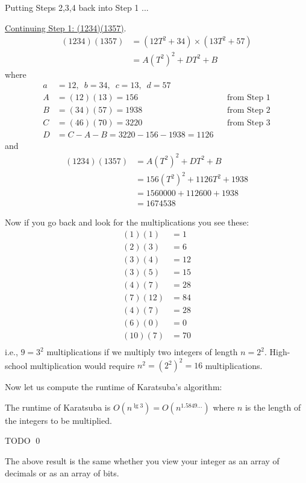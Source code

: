 Putting Steps 2,3,4 back into Step 1 ...

\underline{Continuing Step 1: (1234)(1357)}.
\begin{align*}
(1234)(1357)
&= (12T^2 + 34) \times (13T^2 + 57) \\
&= A (T^2)^2 + D T^2 + B
\end{align*}
where
\begin{align*}
a &= 12, \,\,\, b = 34, \,\,\, c = 13, \,\,\, d = 57 \\
A &= (12)(13) = 156    & & \text{from Step 1}\\
B &= (34)(57) = 1938   & & \text{from Step 2} \\
C &= (46)(70) = 3220   & & \text{from Step 3} \\
D &= C - A - B = 3220 - 156 - 1938 = 1126
\end{align*}
and
\begin{align*}
(1234)(1357)  
&= A(T^2)^2 + D T^2 + B \\
&= 156(T^2)^2 + 1126 T^2 + 1938 \\
&= 1560000 + 112600 + 1938 \\
&= 1674538
\end{align*}

Now if you go back and look for the multiplications you see these:
\begin{align*}
(1)(1) &= 1\\
(2)(3) &= 6\\
(3)(4) &= 12\\
(3)(5) &= 15\\
(4)(7) &= 28\\
(7)(12) &= 84\\
(4)(7) &= 28\\
(6)(0) &= 0\\
(10)(7) &= 70\\
\end{align*}
i.e., $9 = 3^2$ multiplications if we multiply two 
integers of length $n = 2^2$.
High-school multiplication would require $n^2 = (2^2)^2 = 16$
multiplications.


Now let us compute the runtime of Karatsuba's algorithm:

\begin{prop}
  The runtime of Karatsuba is $O(n^{\lg 3}) = O(n^{1.5849...})$
  where $n$ is the length of the integers to be multiplied.
\end{prop}
\proof
TODO
\qed

The above result is the same whether you view your integer as an array
of decimals or as an array of bits.

